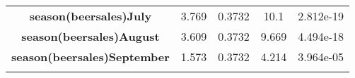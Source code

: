 \documentclass[]{book}
\theoremstyle{definition}
\theoremstyle{definition}
\theoremstyle{remark}
\begin{document}
\begin{longtable}[c]{@{}ccccc@{}}
\begin{minipage}[t]{0.37\columnwidth}\centering\strut
\textbf{season(beersales)July}
\strut\end{minipage} &
\begin{minipage}[t]{0.12\columnwidth}\centering\strut
3.769
\strut\end{minipage} &
\begin{minipage}[t]{0.14\columnwidth}\centering\strut
0.3732
\strut\end{minipage} &
\begin{minipage}[t]{0.11\columnwidth}\centering\strut
10.1
\strut\end{minipage} &
\begin{minipage}[t]{0.11\columnwidth}\centering\strut
2.812e-19
\strut\end{minipage}\tabularnewline
\begin{minipage}[t]{0.37\columnwidth}\centering\strut
\textbf{season(beersales)August}
\strut\end{minipage} &
\begin{minipage}[t]{0.12\columnwidth}\centering\strut
3.609
\strut\end{minipage} &
\begin{minipage}[t]{0.14\columnwidth}\centering\strut
0.3732
\strut\end{minipage} &
\begin{minipage}[t]{0.11\columnwidth}\centering\strut
9.669
\strut\end{minipage} &
\begin{minipage}[t]{0.11\columnwidth}\centering\strut
4.494e-18
\strut\end{minipage}\tabularnewline
\begin{minipage}[t]{0.37\columnwidth}\centering\strut
\textbf{season(beersales)September}
\strut\end{minipage} &
\begin{minipage}[t]{0.12\columnwidth}\centering\strut
1.573
\strut\end{minipage} &
\begin{minipage}[t]{0.14\columnwidth}\centering\strut
0.3732
\strut\end{minipage} &
\begin{minipage}[t]{0.11\columnwidth}\centering\strut
4.214
\strut\end{minipage} &
\begin{minipage}[t]{0.11\columnwidth}\centering\strut
3.964e-05
\strut\end{minipage}\tabularnewline
\begin{minipage}[t]{0.37\columnwidth}\centering\strut

\end{minipage}
\end{longtable}
\end{document}
